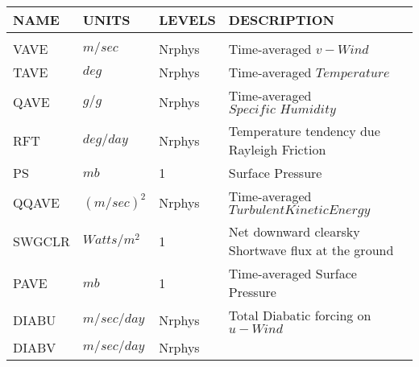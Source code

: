 \newpage
\vspace*{\fill}
\begin{tabular}{llll}
\hline\hline
 NAME & UNITS & LEVELS & DESCRIPTION \\
\hline

&\\
 VAVE     &   $m/sec$  &    Nrphys
     &\begin{minipage}[t]{3in}
      {Time-averaged $v-Wind$}
     \end{minipage}\\
 TAVE     &   $deg$  &    Nrphys
     &\begin{minipage}[t]{3in}
      {Time-averaged $Temperature$}
     \end{minipage}\\
 QAVE     &   $g/g$  &    Nrphys
     &\begin{minipage}[t]{3in}
      {Time-averaged $Specific \, \, Humidity$}
     \end{minipage}\\
 RFT      &    $deg/day$ &  Nrphys
     &\begin{minipage}[t]{3in}
      {Temperature tendency due Rayleigh Friction}
     \end{minipage}\\
 PS       &   $mb$  &    1
     &\begin{minipage}[t]{3in}
      {Surface Pressure}
     \end{minipage}\\
 QQAVE    &   $(m/sec)^2$  &    Nrphys
     &\begin{minipage}[t]{3in}
      {Time-averaged $Turbulent Kinetic Energy$}
     \end{minipage}\\
 SWGCLR   &   $Watts/m^2$  &    1  
     &\begin{minipage}[t]{3in}
      {Net downward clearsky Shortwave flux at the ground} 
     \end{minipage}\\
 PAVE     &   $mb$  &    1
     &\begin{minipage}[t]{3in}
      {Time-averaged Surface Pressure}
     \end{minipage}\\
 DIABU    & $m/sec/day$ &    Nrphys
     &\begin{minipage}[t]{3in}
      {Total Diabatic forcing on $u-Wind$} 
     \end{minipage}\\
 DIABV    & $m/sec/day$ &    Nrphys
     &\begin{minipage}[t]{3in}

\end{minipage}
\end{tabular}
